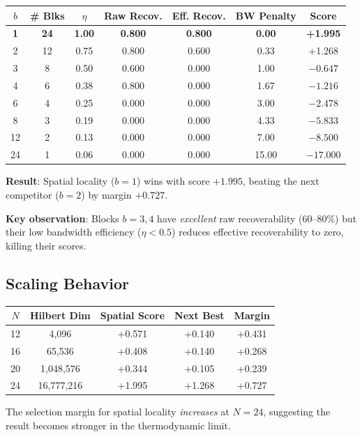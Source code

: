 \documentclass[11pt]{article}
\begin{document}
\begin{center}
\begin{tabular}{ccccccc}
\toprule
$b$ & \# Blks & $\eta$ & Raw Recov. & Eff. Recov. & BW Penalty & Score \\
\midrule
\textbf{1} & \textbf{24} & \textbf{1.00} & \textbf{0.800} & \textbf{0.800} & \textbf{0.00} & \textbf{+1.995} \\
2 & 12 & 0.75 & 0.800 & 0.600 & 0.33 & +1.268 \\
3 & 8 & 0.50 & 0.600 & 0.000 & 1.00 & $-0.647$ \\
4 & 6 & 0.38 & 0.800 & 0.000 & 1.67 & $-1.216$ \\
6 & 4 & 0.25 & 0.000 & 0.000 & 3.00 & $-2.478$ \\
8 & 3 & 0.19 & 0.000 & 0.000 & 4.33 & $-5.833$ \\
12 & 2 & 0.13 & 0.000 & 0.000 & 7.00 & $-8.500$ \\
24 & 1 & 0.06 & 0.000 & 0.000 & 15.00 & $-17.000$ \\
\bottomrule
\end{tabular}
\end{center}

\textbf{Result}: Spatial locality ($b=1$) wins with score $+1.995$, beating the 
next competitor ($b=2$) by margin $+0.727$.

\textbf{Key observation}: Blocks $b=3,4$ have \emph{excellent} raw recoverability 
(60--80\%) but their low bandwidth efficiency ($\eta < 0.5$) reduces effective 
recoverability to zero, killing their scores.

\subsection{Scaling Behavior}

\begin{center}
\begin{tabular}{ccccc}
\toprule
$N$ & Hilbert Dim & Spatial Score & Next Best & Margin \\
\midrule
12 & 4,096 & +0.571 & +0.140 & +0.431 \\
16 & 65,536 & +0.408 & +0.140 & +0.268 \\
20 & 1,048,576 & +0.344 & +0.105 & +0.239 \\
24 & 16,777,216 & +1.995 & +1.268 & +0.727 \\
\bottomrule
\end{tabular}
\end{center}

The selection margin for spatial locality \emph{increases} at $N=24$, suggesting 
the result becomes stronger in the thermodynamic limit.
\end{document}
